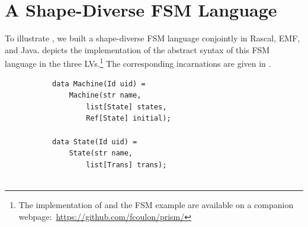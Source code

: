 \section{A Shape-Diverse FSM Language}
\label{sec:eval}

To illustrate \prism, we built a shape-diverse FSM language conjointly in Rascal, EMF, and Java.
 depicts the implementation of the abstract syntax of this FSM language in the three LVs.\footnote{The implementation of \prism and the FSM example are available on a companion webpage:~\url{https://github.com/fcoulon/prism/}}
The corresponding incarnations are given in .

\begin{figure}[bt]
	\centering
	\begin{subfigure}[b]{.3\columnwidth}
		\begin{lstlisting}[label=lst:fsm-adt, language=Rascal, numbers=none, xleftmargin=0pt, tabsize=1]
data Machine(Id uid) =
	Machine(str name,
		list[State] states,
		Ref[State] initial);

data State(Id uid) =
	State(str name,
		list[Trans] trans);


\end{lstlisting}
\end{subfigure}
\end{figure}

